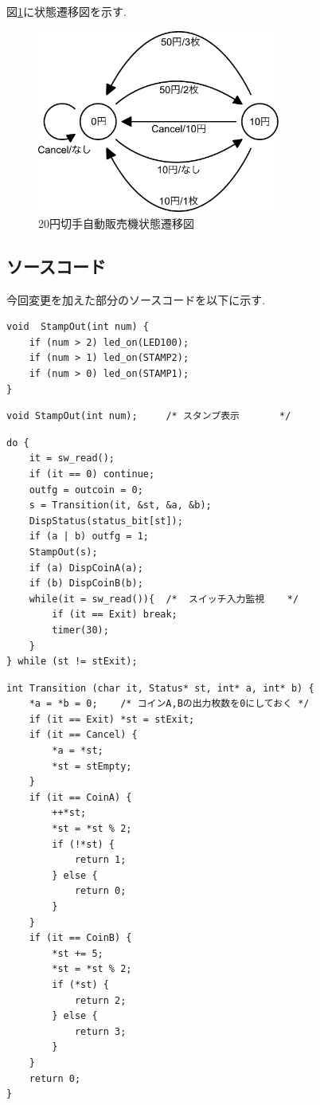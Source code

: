 \documentclass[titlepage]{jsarticle}
\begin{document}
    図\ref{fig:本番状態遷移図}に状態遷移図を示す.

    \begin{figure}[ht]
        \centering
        \includegraphics[width=8cm]{images/honban.pdf}
        \caption{20円切手自動販売機状態遷移図}
        \label{fig:本番状態遷移図}
    \end{figure}

    \subsection{ソースコード}
        今回変更を加えた部分のソースコードを以下に示す. \\

        \begin{lstlisting}[caption=piclib.c, label=piclib]
void  StampOut(int num) {
    if (num > 2) led_on(LED100);
    if (num > 1) led_on(STAMP2);
    if (num > 0) led_on(STAMP1);
}
        \end{lstlisting}

        \begin{lstlisting}[caption=piclib.h extern.h]
void StampOut(int num);		/* スタンプ表示		*/
        \end{lstlisting}

        \begin{lstlisting}[caption=stamp.c メインループ, label=main]
do {
    it = sw_read();
    if (it == 0) continue;
    outfg = outcoin = 0;
    s = Transition(it, &st, &a, &b);
    DispStatus(status_bit[st]);
    if (a | b) outfg = 1;
    StampOut(s);
    if (a) DispCoinA(a);
    if (b) DispCoinB(b);
    while(it = sw_read()){	/*  スイッチ入力監視	*/
        if (it == Exit) break;
        timer(30);
    }
} while (st != stExit);
        \end{lstlisting}

        \begin{lstlisting}[caption=stamp.c 遷移関数, label=transition]
int Transition (char it, Status* st, int* a, int* b) {
    *a = *b = 0;	/* コインA,Bの出力枚数を0にしておく */
    if (it == Exit) *st = stExit;
    if (it == Cancel) {
        *a = *st;
        *st = stEmpty;
    }
    if (it == CoinA) {
        ++*st;
        *st = *st % 2;
        if (!*st) {
            return 1;
        } else {
            return 0;
        }
    }
    if (it == CoinB) {
        *st += 5;
        *st = *st % 2;
        if (*st) {
            return 2;
        } else {
            return 3;
        }
    }
    return 0;
}
        \end{lstlisting}
\end{document}
